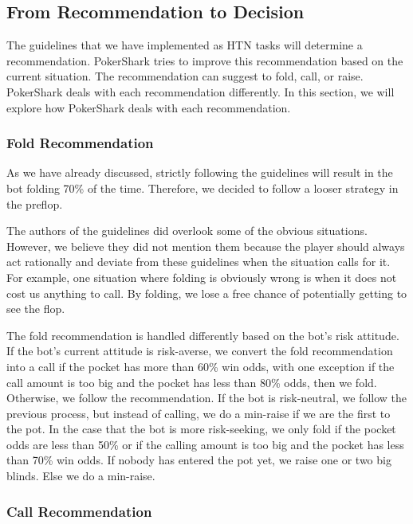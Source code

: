 \subsection{From Recommendation to Decision}

The guidelines that we have implemented as HTN tasks will determine a recommendation. PokerShark tries to improve this recommendation based on the current situation. The recommendation can suggest to fold, call, or raise. PokerShark deals with each recommendation differently. In this section, we will explore how PokerShark deals with each recommendation.

\subsubsection{Fold Recommendation}

As we have already discussed, strictly following the guidelines will result in the bot folding 70\% of the time. Therefore, we decided to follow a looser strategy in the preflop.

The authors of the guidelines did overlook some of the obvious situations. However, we believe they did not mention them because the player should always act rationally and deviate from these guidelines when the situation calls for it. For example, one situation where folding is obviously wrong is when it does not cost us anything to call. By folding, we lose a free chance of potentially getting to see the flop.

The fold recommendation is handled differently based on the bot's risk attitude. If the bot's current attitude is risk-averse, we convert the fold recommendation into a call if the pocket has more than 60\% win odds, with one exception if the call amount is too big and the pocket has less than 80\% odds, then we fold. Otherwise, we follow the recommendation.
If the bot is risk-neutral, we follow the previous process, but instead of calling, we do a min-raise if we are the first to the pot.
In the case that the bot is more risk-seeking, we only fold if the pocket odds are less than 50\% or if the calling amount is too big and the pocket has less than 70\% win odds. If nobody has entered the pot yet, we raise one or two big blinds. Else we do a min-raise.


\subsubsection{Call Recommendation}

